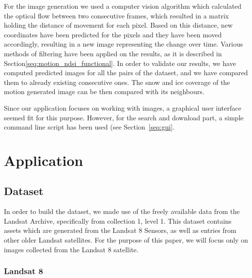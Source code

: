 \documentclass[12pt, a4paper]{report}
\begin{document}
	\par For the image generation we used a computer vision algorithm which calculated the optical flow between two consecutive frames, which resulted in a matrix holding the distance of movement for each pixel. Based on this distance, new coordinates have been predicted for the pixels and they have been moved accordingly, resulting in a new image representing the change over time. Various methods of filtering have been applied on the results, as it is described in Section\ref{seq:motion_ndsi_functional}. In order to validate our results, we have computed predicted images for all the pairs of the dataset, and we have compared them to already existing consecutive ones. The snow and ice coverage of the motion generated image can be then compared with its neighbours.

	\par Since our application focuses on working with images, a graphical user interface seemed fit for this purpose. However, for the search and download part, a simple command line script has been used (see Section~\ref{seq:gui}.
	
	\newpage{}
	
	\chapter{Application}
	\section{Dataset}

	\par In order to build the dataset, we made use of the freely available data from the Landsat Archive, specifically from collection 1, level 1. This dataset contains assets which are generated from the Landsat 8 Sensors, as well as entries from other older Landsat satellites. For the purpose of this paper, we will focus only on images collected from the Landsat 8 satellite.
	
	\subsection{Landsat 8}
	\label{seq:landsat8_section}
\end{document}
